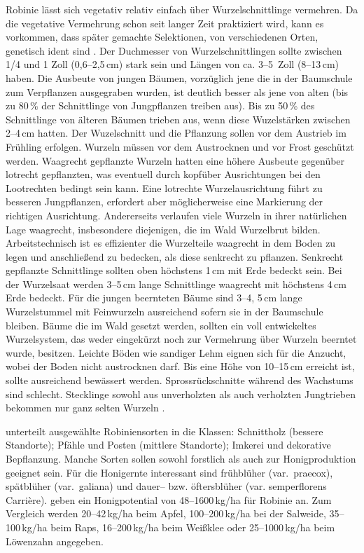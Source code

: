 \documentclass[twocolumn]{scrartcl}
\begin{document}
Robinie lässt sich vegetativ relativ einfach über Wurzelschnittlinge
vermehren. Da die vegetative Vermehrung schon seit langer Zeit
praktiziert wird, kann es vorkommen, dass später gemachte Selektionen,
von verschiedenen Orten, genetisch ident sind
\citep{liesebach2012robinie}. Der Duchmesser von Wurzelschnittlingen
sollte zwischen 1/4 und 1 Zoll (0,6--2,5\,cm) stark sein und Längen
von ca. 3--5~Zoll (8--13\,cm) haben. Die Ausbeute von jungen Bäumen,
vorzüglich jene die in der Baumschule zum Verpflanzen ausgegraben
wurden, ist deutlich besser als jene von alten (bis zu 80\,\% der
Schnittlinge von Jungpflanzen treiben aus).  Bis zu 50\,\% des
Schnittlinge von älteren Bäumen trieben aus, wenn diese Wuzelstärken
zwischen 2--4\,cm hatten.  Der Wuzelschnitt und die Pflanzung sollen
vor dem Austrieb im Frühling erfolgen. Wurzeln müssen vor dem
Austrocknen und vor Frost geschützt werden. Waagrecht gepflanzte
Wurzeln hatten eine höhere Ausbeute gegenüber lotrecht gepflanzten,
was eventuell durch kopfüber Ausrichtungen bei den Lootrechten bedingt
sein kann. Eine lotrechte Wurzelausrichtung führt zu besseren
Jungpflanzen, erfordert aber möglicherweise eine Markierung der
richtigen Ausrichtung. Andererseits verlaufen viele Wurzeln in ihrer
natürlichen Lage waagrecht, insbesondere diejenigen, die im Wald
Wurzelbrut bilden. Arbeitstechnisch ist es effizienter die
Wurzelteile waagrecht in dem Boden zu legen und anschließend zu
bedecken, als diese senkrecht zu pflanzen.
Senkrecht gepflanzte Schnittlinge sollten oben höchstens 1\,cm mit
Erde bedeckt sein. Bei der Wurzelsaat werden 3--5\,cm lange Schnittlinge
waagrecht mit höchstens 4\,cm Erde bedeckt.
Für die jungen beernteten Bäume sind 3--4, 5\,cm lange Wurzelstummel mit Feinwurzeln ausreichend sofern sie in der Baumschule bleiben. Bäume die
im Wald gesetzt werden, sollten ein voll entwickeltes Wurzelsystem,
das weder eingekürzt noch zur Vermehrung über Wurzeln beerntet wurde, besitzen.
Leichte Böden wie sandiger
Lehm eignen sich für die Anzucht, wobei der Boden nicht austrocknen darf.
Bis eine Höhe von 10--15\,cm erreicht ist, sollte ausreichend bewässert werden.
Sprossrückschnitte während des Wachstums sind
schlecht. Stecklinge sowohl aus unverholzten als auch verholzten
Jungtrieben bekommen nur ganz selten Wurzeln
\citep{swingle1937robinie,redei2001robinieVermehrung,redei2005robinieVermehrung}.

\citet{keresztesi1983robinie} unterteilt ausgewählte Robiniensorten in
die Klassen: Schnittholz (bessere Standorte); Pfähle und Posten
(mittlere Standorte); Imkerei und dekorative Bepflanzung. Manche
Sorten sollen sowohl forstlich als auch zur Honigproduktion geeignet
sein. Für die Honigernte interessant sind frühblüher (var.\ praecox),
spätblüher (var.\ galiana) und dauer-- bzw. öftersblüher
(var. semperflorens Carrière). \citet[S.~80]{crane1986honig} geben ein
Honigpotential von 48--1600\,kg/ha für Robinie an. Zum Vergleich werden
20--42\,kg/ha beim Apfel, 100--200\,kg/ha bei der Salweide,
35--100\,kg/ha beim Raps, 16--200\,kg/ha beim Weißklee oder
25--1000\,kg/ha beim Löwenzahn angegeben.
\end{document}
